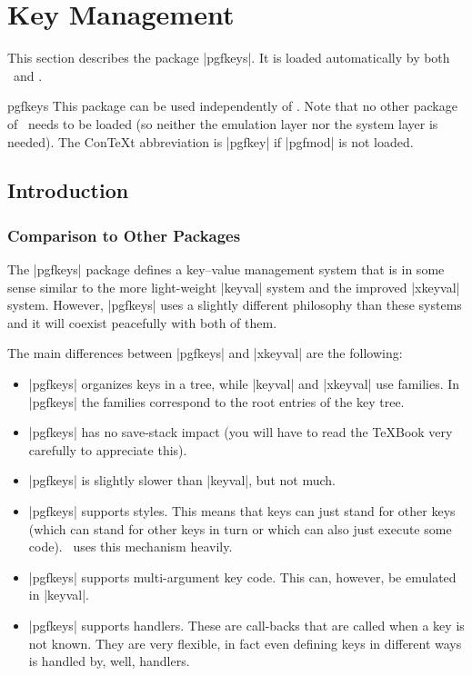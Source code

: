 %
%
%


\section{Key Management}
\label{section-keys}

This section describes the package |pgfkeys|. It is loaded
automatically by both \pgfname\ and \tikzname.

\begin{package}{pgfkeys}
  This package can be used independently of \pgfname. Note that no
  other package of \pgfname\ needs to be loaded (so neither the
  emulation layer nor the system layer is needed). The Con\TeX t
  abbreviation is |pgfkey| if |pgfmod| is not loaded.                   %
\end{package}



\subsection{Introduction}

\subsubsection{Comparison to Other Packages}

The |pgfkeys| package defines a key--value management system that is in
some sense similar to the more light-weight |keyval| system and the
improved |xkeyval| system. However, |pgfkeys| uses a slightly
different philosophy than these systems and it will coexist peacefully
with both of them.

The main differences between |pgfkeys| and |xkeyval| are the
following:

\begin{itemize}
\item |pgfkeys| organizes keys in a tree, while |keyval| and |xkeyval|
  use families. In |pgfkeys| the families correspond to the root
  entries of the key tree.
\item |pgfkeys| has no save-stack impact (you will have to read the
  \TeX Book very carefully to appreciate this).
\item |pgfkeys| is slightly slower than |keyval|, but not much.
\item |pgfkeys| supports styles. This means that keys can just stand
  for other keys (which can stand for other keys in turn or which can
  also just execute some code). \tikzname\ uses this mechanism heavily.
\item |pgfkeys| supports multi-argument key code. This can, however,
  be emulated in |keyval|.
\item |pgfkeys| supports handlers. These are call-backs that are
  called when a key is not known. They are very flexible, in fact even
  defining keys in different ways is handled by, well, handlers.
\end{itemize}


